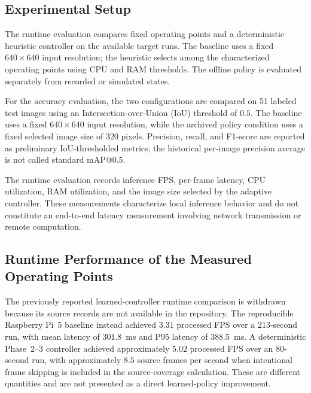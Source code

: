 \documentclass{ieeeaccess}
\begin{document}
\subsection{Experimental Setup}
\label{subsec:exp_setup}

\begin{highlight}
The runtime evaluation compares fixed operating points and a deterministic
heuristic controller on the available target runs. The baseline uses a fixed
$640\times640$ input resolution; the heuristic selects among the
characterized operating points using CPU and RAM thresholds. The offline
policy is evaluated separately from recorded or simulated states.
\end{highlight}

\begin{highlight}
For the accuracy evaluation, the two configurations are compared on 51
labeled test images using an Intersection-over-Union (IoU) threshold of
$0.5$. The baseline uses a fixed $640\times640$ input resolution, while the
archived policy condition uses a fixed selected image size of 320 pixels.
Precision, recall, and F1-score are reported as preliminary IoU-thresholded
metrics; the historical per-image precision average is not called standard
mAP@0.5.
\end{highlight}

The runtime evaluation records inference FPS, per-frame latency, CPU
utilization, RAM utilization, and the image size selected by the adaptive
controller. These measurements characterize local inference behavior and do
not constitute an end-to-end latency measurement involving network
transmission or remote computation.

\subsection{Runtime Performance of the Measured Operating Points}

\begin{highlight}
The previously reported learned-controller runtime comparison is withdrawn
because its source records are not available in the repository. The
reproducible Raspberry Pi~5 baseline instead achieved $3.31$ processed FPS
over a 213-second run, with mean latency of $301.8$~ms and P95 latency of
$388.5$~ms. A deterministic Phase~2--3 controller achieved approximately
$5.02$ processed FPS over an 80-second run, with approximately $8.5$
source frames per second when intentional frame skipping is included in the
source-coverage calculation. These are different quantities and are not
presented as a direct learned-policy improvement.
\end{highlight}
\end{document}
